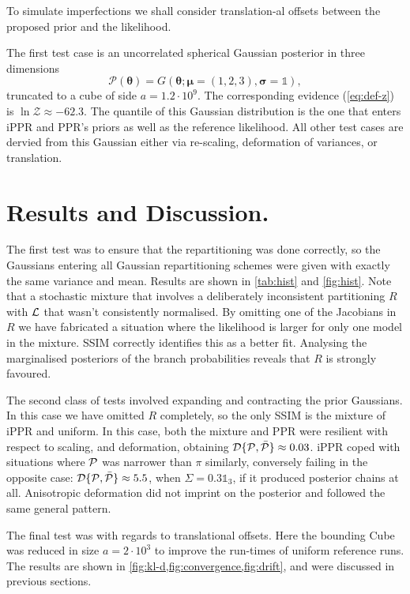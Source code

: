 \documentclass[usenatbib]{mnras}
\begin{document}
To simulate imperfections we shall consider translation-al offsets
between the proposed prior and the likelihood.


The first test case is an uncorrelated spherical Gaussian posterior
in three dimensions
\begin{equation}
\mathcal{P}(\bm{\theta}) = G(\bm{\theta}; \bm{\mu} =
  (1,2,3),\bm{\sigma} = \mathds{1}),
\end{equation}
truncated to a cube of side \(a = 1.2 \cdot 10^{9}\). The
corresponding evidence (\cref{eq:def-z}) is
\(\ln \mathcal{Z}\approx-62.3\). The quantile of this Gaussian
distribution is the one that enters iPPR and PPR's priors as well as
the reference likelihood. All other test cases are dervied from this
Gaussian either via re-scaling, deformation of variances, or
translation. 


\section{Results and Discussion.}\label{sec:results}
The first test was to ensure that the repartitioning was done
correctly, so the Gaussians entering all Gaussian repartitioning
schemes were given with exactly the same variance and mean. Results
are shown in \cref{tab:hist} and \cref{fig:hist}. Note that a
stochastic mixture that involves a deliberately inconsistent
partitioning \(R\) with ${\cal L}$ that wasn't consistently
normalised. By omitting one of the Jacobians in \(R\) we have
fabricated a situation where the likelihood is larger for only one
model in the mixture. SSIM correctly identifies this as a better
fit. Analysing the marginalised posteriors of the branch probabilities
reveals that \(R\) is strongly favoured. 


The second class of tests involved expanding and contracting the prior
Gaussians. In this case we have omitted \(R\) completely, so the only
SSIM is the mixture of iPPR and uniform. In this case, both the
mixture and PPR were resilient with respect to scaling, and
deformation, obtaining
${\cal D}\{ {\cal P}, \bar{\cal P}\} \approx 0.03$. iPPR coped with
situations where ${\cal P}$ was narrower than $\pi$ similarly,
conversely failing in the opposite case:
${\cal D}\{ {\cal P}, \bar{\cal P}\} \approx 5.5$, when
$\Sigma = 0.3 \mathds{1}_{3}$, if it produced posterior chains at
all. Anisotropic deformation did not imprint on the posterior and
followed the same general pattern.

The final test was with regards to translational offsets. Here the
bounding Cube was reduced in size \(a = 2\cdot 10^{3}\) to improve the
run-times of uniform reference runs. The results are shown in
\cref{fig:kl-d,fig:convergence,fig:drift}, and were discussed in
previous sections.
\end{document}
